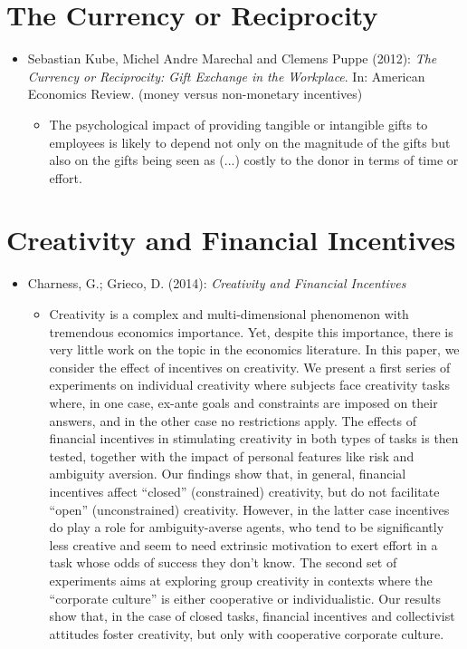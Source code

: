 \section{The Currency or Reciprocity}
\begin{itemize}
	\item Sebastian Kube, Michel Andre Marechal and Clemens Puppe (2012): \textit{The Currency or Reciprocity: Gift Exchange in the Workplace}. In: American Economics Review. (money versus non-monetary incentives)
		\begin{itemize}
			\item The psychological impact of providing tangible or intangible gifts to employees is likely to depend not only on the magnitude of the gifts but also on the gifts being seen as (...) costly to the donor in terms of time or effort.
		\end{itemize}
\end{itemize}

\section{Creativity and Financial Incentives}
\begin{itemize}
	\item Charness, G.; Grieco, D. (2014): \textit{Creativity and Financial Incentives} 
		\begin{itemize}
			\item Creativity is a complex and multi-dimensional phenomenon with tremendous economics importance. Yet, despite this importance, there is very little work on the topic in the economics literature. In this paper, we consider the effect of incentives on creativity. We present a first series of experiments on individual creativity where subjects face creativity tasks where, in one case, ex-ante goals and constraints are imposed on their answers, and in the other case no restrictions apply. The effects of financial incentives in stimulating creativity in both types of tasks is then tested, together with the impact of personal features like risk and ambiguity aversion. Our findings show that, in general, financial incentives affect “closed” (constrained) creativity, but do not facilitate “open” (unconstrained) creativity. However, in the latter case incentives do play a role for ambiguity-averse agents, who tend to be significantly less creative and seem to need extrinsic motivation to exert effort in a task whose odds of success they don’t know. The second set of experiments aims at exploring group creativity in contexts where the “corporate culture” is either cooperative or individualistic. Our results show that, in the case of closed tasks, financial incentives and collectivist attitudes foster creativity, but only with cooperative corporate culture.
		\end{itemize}
\end{itemize}


\newpage